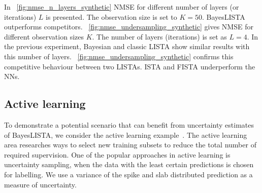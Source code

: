 \documentclass{article}
\begin{document}
  In \figurename~\ref{fig:nmse_n_layers_synthetic} NMSE for different number of layers (or iterations) $L$ is presented. The observation size is set to $K=50$. BayesLISTA outperforms competitors.
   \figurename~\ref{fig:nmse_undersampling_synthetic} gives NMSE for different observation sizes $K$. The number of layers (iterations) is set as $L=4$. In the previous experiment, Bayesian and classic LISTA show similar results with this number of layers. \figurename~\ref{fig:nmse_undersampling_synthetic} confirms this competitive behaviour between two LISTAs. ISTA and FISTA underperform the NNs. %
  
  \subsection{Active learning}
 To demonstrate a potential scenario that can benefit from uncertainty estimates of BayesLISTA, we consider the active learning example~\cite{settles.tr09}. The active learning area researches ways to select new training subsets to reduce the total number of required supervision. One of the popular approaches in active learning is uncertainty sampling, when the data with the least certain predictions is chosen for labelling. We use a variance of the spike and slab distributed prediction as a measure of uncertainty.
  
\end{document}
